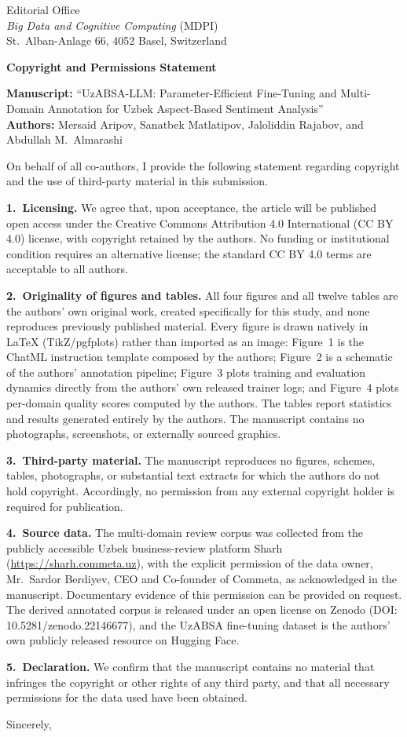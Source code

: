 \documentclass[11pt]{letter}
\begin{document}
\begin{letter}{%
  Editorial Office\\
  \textit{Big Data and Cognitive Computing} (MDPI)\\
  St.\ Alban-Anlage 66, 4052 Basel, Switzerland}

\opening{\textbf{Copyright and Permissions Statement}}

\textbf{Manuscript:} ``UzABSA-LLM: Parameter-Efficient Fine-Tuning and Multi-Domain Annotation for Uzbek Aspect-Based Sentiment Analysis''\\
\textbf{Authors:} Mersaid Aripov, Sanatbek Matlatipov, Jaloliddin Rajabov, and Abdullah M.\ Almarashi

On behalf of all co-authors, I provide the following statement regarding copyright and the use of third-party material in this submission.

\textbf{1.~Licensing.} We agree that, upon acceptance, the article will be published open access under the Creative Commons Attribution 4.0 International (CC BY 4.0) license, with copyright retained by the authors. No funding or institutional condition requires an alternative license; the standard CC BY 4.0 terms are acceptable to all authors.

\textbf{2.~Originality of figures and tables.} All four figures and all twelve tables are the authors' own original work, created specifically for this study, and none reproduces previously published material. Every figure is drawn natively in \LaTeX{} (TikZ/pgfplots) rather than imported as an image: Figure~1 is the ChatML instruction template composed by the authors; Figure~2 is a schematic of the authors' annotation pipeline; Figure~3 plots training and evaluation dynamics directly from the authors' own released trainer logs; and Figure~4 plots per-domain quality scores computed by the authors. The tables report statistics and results generated entirely by the authors. The manuscript contains no photographs, screenshots, or externally sourced graphics.

\textbf{3.~Third-party material.} The manuscript reproduces no figures, schemes, tables, photographs, or substantial text extracts for which the authors do not hold copyright. Accordingly, no permission from any external copyright holder is required for publication.

\textbf{4.~Source data.} The multi-domain review corpus was collected from the publicly accessible Uzbek business-review platform Sharh (\url{https://sharh.commeta.uz}), with the explicit permission of the data owner, Mr.~Sardor Berdiyev, CEO and Co-founder of Commeta, as acknowledged in the manuscript. Documentary evidence of this permission can be provided on request. The derived annotated corpus is released under an open license on Zenodo (DOI: 10.5281/zenodo.22146677), and the UzABSA fine-tuning dataset is the authors' own publicly released resource on Hugging Face.

\textbf{5.~Declaration.} We confirm that the manuscript contains no material that infringes the copyright or other rights of any third party, and that all necessary permissions for the data used have been obtained.

\closing{Sincerely,}

\end{letter}
\end{document}
